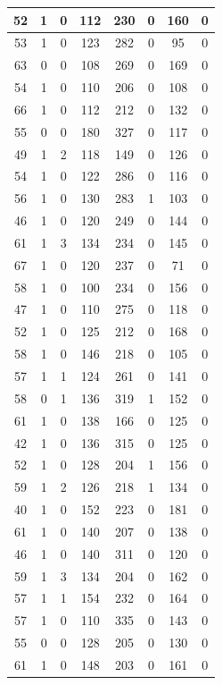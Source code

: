 \documentclass{article}
\begin{document}
\begin{longtable}{|c|c|c|c|c|c|c|c|}
\hline
52 & 1 & 0 & 112 & 230 & 0 & 160 & 0 \\
\hline
53 & 1 & 0 & 123 & 282 & 0 & 95 & 0 \\
\hline
63 & 0 & 0 & 108 & 269 & 0 & 169 & 0 \\
\hline
54 & 1 & 0 & 110 & 206 & 0 & 108 & 0 \\
\hline
66 & 1 & 0 & 112 & 212 & 0 & 132 & 0 \\
\hline
55 & 0 & 0 & 180 & 327 & 0 & 117 & 0 \\
\hline
49 & 1 & 2 & 118 & 149 & 0 & 126 & 0 \\
\hline
54 & 1 & 0 & 122 & 286 & 0 & 116 & 0 \\
\hline
56 & 1 & 0 & 130 & 283 & 1 & 103 & 0 \\
\hline
46 & 1 & 0 & 120 & 249 & 0 & 144 & 0 \\
\hline
61 & 1 & 3 & 134 & 234 & 0 & 145 & 0 \\
\hline
67 & 1 & 0 & 120 & 237 & 0 & 71 & 0 \\
\hline
58 & 1 & 0 & 100 & 234 & 0 & 156 & 0 \\
\hline
47 & 1 & 0 & 110 & 275 & 0 & 118 & 0 \\
\hline
52 & 1 & 0 & 125 & 212 & 0 & 168 & 0 \\
\hline
58 & 1 & 0 & 146 & 218 & 0 & 105 & 0 \\
\hline
57 & 1 & 1 & 124 & 261 & 0 & 141 & 0 \\
\hline
58 & 0 & 1 & 136 & 319 & 1 & 152 & 0 \\
\hline
61 & 1 & 0 & 138 & 166 & 0 & 125 & 0 \\
\hline
42 & 1 & 0 & 136 & 315 & 0 & 125 & 0 \\
\hline
52 & 1 & 0 & 128 & 204 & 1 & 156 & 0 \\
\hline
59 & 1 & 2 & 126 & 218 & 1 & 134 & 0 \\
\hline
40 & 1 & 0 & 152 & 223 & 0 & 181 & 0 \\
\hline
61 & 1 & 0 & 140 & 207 & 0 & 138 & 0 \\
\hline
46 & 1 & 0 & 140 & 311 & 0 & 120 & 0 \\
\hline
59 & 1 & 3 & 134 & 204 & 0 & 162 & 0 \\
\hline
57 & 1 & 1 & 154 & 232 & 0 & 164 & 0 \\
\hline
57 & 1 & 0 & 110 & 335 & 0 & 143 & 0 \\
\hline
55 & 0 & 0 & 128 & 205 & 0 & 130 & 0 \\
\hline
61 & 1 & 0 & 148 & 203 & 0 & 161 & 0 \\

\end{longtable}
\end{document}
